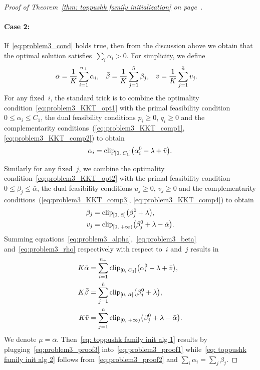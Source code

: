 \begin{proof}[Proof of Theorem~\ref{thm: toppushk family initialization} on page~\pageref{thm: toppushk family initialization}]
  \paragraph*{Case 2:} If~\eqref{eq:problem3_cond} holds true, then from the discussion above we obtain that the optimal solution satisfies~$\sum_i \alpha_i > 0$. For simplicity, we define
  \begin{align*}
    \bar{\alpha} & = \frac{1}{K} \sum_{i=1}^{n_{+}} \alpha_i, &
    \bar{\beta} & = \frac{1}{K} \sum_{j=1}^{\tilde{n}} \beta_j, &
    \bar{v} & = \frac{1}{K} \sum_{j=1}^{\tilde{n}} v_j.
  \end{align*}
  For any fixed~$i$, the standard trick is to combine the optimality condition~\eqref{eq:problem3_KKT_opt1} with the primal feasibility condition~$0 \le \alpha_i \le C_1$, the dual feasibility conditions $p_i \ge 0$, $q_i \ge 0$ and the complementarity conditions~(\ref{eq:problem3_KKT_comp1}, \ref{eq:problem3_KKT_comp2}) to obtain
  \begin{equation}\label{eq:problem3_alpha}
    \alpha_i = \clip{0}{C_1}{\alpha_i^0 - \lambda + \bar{v}}.
  \end{equation}
  
  Similarly for any fixed~$j$, we combine the optimality condition~\eqref{eq:problem3_KKT_opt2} with the primal feasibility condition~$0 \le \beta_j \le \bar{\alpha}$, the dual feasibility conditions $u_j \ge 0$, $v_j \ge 0$ and the complementarity conditions~(\ref{eq:problem3_KKT_comp3}, \ref{eq:problem3_KKT_comp4}) to obtain
  \begin{align}
    \beta_j
      & = \clip{0}{\bar{\alpha}}{\beta_j^0 + \lambda}, \label{eq:problem3_beta} \\
    v_j
      & = \clip[u]{0}{+\infty}{\beta_j^0 + \lambda - \bar{\alpha}}. \label{eq:problem3_rho}
  \end{align}
  Summing equations~\eqref{eq:problem3_alpha},~\eqref{eq:problem3_beta} and~\eqref{eq:problem3_rho} respectively with respect to~$i$ and~$j$ results in
  \begin{subequations}
    \begin{align}
      K \bar{\alpha}
        & = \sum_{i=1}^{\npos}\clip{0}{C_1}{\alpha_i^0 - \lambda + \bar{v}},
        \label{eq:problem3_proof1} \\
      K \bar{\beta}
        &= \sum_{j=1}^{\ntil} \clip{0}{\bar{\alpha}}{\beta_j^0 + \lambda},
        \label{eq:problem3_proof2} \\
      K \bar{v}
        & = \sum_{j=1}^{\ntil} \clip[u]{0}{+\infty}{\beta_j^0 + \lambda - \bar{\alpha}}.
        \label{eq:problem3_proof3}
    \end{align}
  \end{subequations}
  We denote $\mu = \bar{\alpha}$. Then~\eqref{eq: toppushk family init alg 1} results by plugging~\eqref{eq:problem3_proof3} into~\eqref{eq:problem3_proof1} while~\eqref{eq: toppushk family init alg 2} follows from~\eqref{eq:problem3_proof2} and $\sum_i \alpha_i = \sum_j \beta_j$. 
\end{proof}

